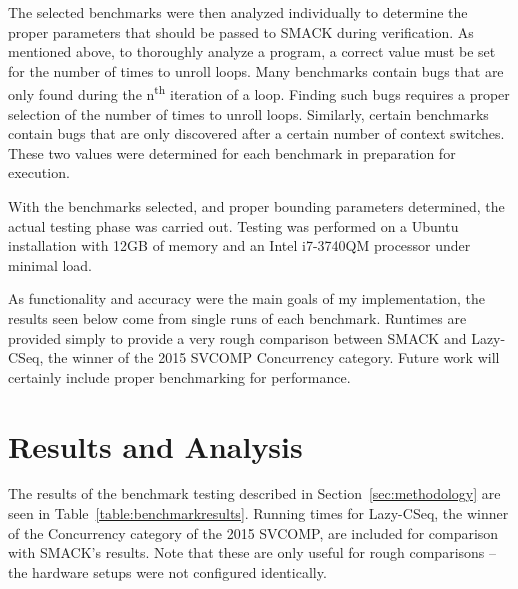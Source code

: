 The selected benchmarks were then analyzed individually to determine
the proper parameters that should be passed to SMACK during
verification.  As mentioned above, to thoroughly analyze a program, a
correct value must be set for the number of times to unroll loops.
Many benchmarks contain bugs that are only found during the
n\textsuperscript{th} iteration of a loop.  Finding such bugs requires a
proper selection of the number of times to unroll loops.  Similarly,
certain benchmarks contain bugs that are only discovered after a
certain number of context switches.  These two values were determined
for each benchmark in preparation for execution.

With the benchmarks selected, and proper bounding parameters
determined, the actual testing phase was carried out.  Testing was
performed on a Ubuntu installation with 12GB of memory and an Intel
i7-3740QM processor under minimal load.

As functionality and accuracy were the main goals of my
implementation, the results seen below come from single runs of each
benchmark.  Runtimes are provided simply to provide a very rough
comparison between SMACK and Lazy-CSeq, the winner of the 2015 SVCOMP
Concurrency category.   Future work will certainly include proper
benchmarking for performance. 

\section{Results and Analysis}
The results of the benchmark testing described in
Section~\ref{sec:methodology} are seen in
Table~\ref{table:benchmarkresults}.  Running times for Lazy-CSeq, the winner 
of the Concurrency category of the 2015 SVCOMP, are included for
comparison with SMACK's results.  Note that these are only useful for
rough comparisons -- the hardware setups were not configured
identically.  

\newcommand{\specialcell}[3][c]{%
  \begin{tabular}[#1]{@{}#2@{}}#3\end{tabular}}


